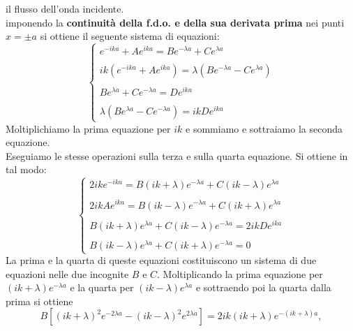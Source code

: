 il flusso dell'onda incidente.\\
imponendo la \textbf{continuità della f.d.o. e della sua derivata prima} nei punti $x=\pm a$ si ottiene il seguente sistema di equazioni:
\begin{equation}
\begin{cases}
\displaystyle{e^{-ika}+ Ae^{ika}= Be^{-\lambda a} + C e^{\lambda a}}\\
\\
\displaystyle{ik \left(e^{-ika}+ Ae^{ika}\right)= \lambda \left(Be^{-\lambda a} - C e^{\lambda a}\right)}\\
\\
\displaystyle{Be^{\lambda a} + Ce^{-\lambda a}= De^{ika}}\\
\\
\displaystyle{\lambda \left(Be^{\lambda a} -Ce^{-\lambda a} \right)= ikDe^{ika}}
\end{cases}
\end{equation}
Moltiplichiamo la prima equazione per $ik$ e sommiamo e sottraiamo la seconda equazione.\\
Eseguiamo le stesse operazioni sulla terza e sulla quarta equazione. Si ottiene in tal modo:
\begin{equation}
\begin{cases}
\displaystyle{2ike^{-ika}= B \left(ik+\lambda\right)e^{-\lambda a} +C \left(ik-\lambda\right)e^{\lambda a} }\\
\\
\displaystyle{2ikAe^{ika}= B \left(ik-\lambda\right)e^{-\lambda a} +C \left(ik+\lambda\right)e^{\lambda a} }\\
\\
\displaystyle{B\left(ik+\lambda\right)e^{\lambda a} + C\left(ik-\lambda\right)e^{-\lambda a} = 2ikD e^{ika}}\\
\\
\displaystyle{B\left(ik-\lambda\right)e^{\lambda a} + C\left(ik+\lambda\right)e^{-\lambda a} =0}
\end{cases}
\label{eq:cap10_10}
\end{equation}
La prima e la quarta di queste equazioni costituiscono un sistema di due equazioni nelle due incognite $B$ e $C$. Moltiplicando la prima equazione per $(ik+\lambda) e^{-\lambda a }$ e la quarta per $(ik-\lambda) e^{\lambda a }$ e sottraendo poi la quarta dalla prima si ottiene
\begin{equation}
B\left[ (ik+\lambda)^2 e^{-2\lambda a }-(ik-\lambda)^2 e^{2\lambda a }\right]= 2ik(ik+\lambda) e^{-\left(ik+\lambda\right) a },
\end{equation} 
